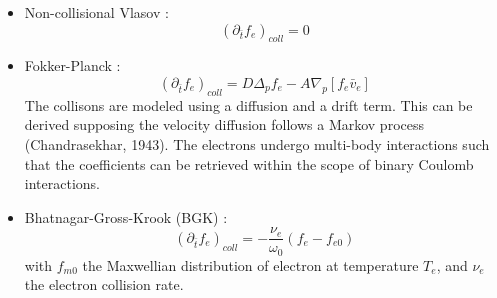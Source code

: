 \begin{itemize}
\item Non-collisional Vlasov :
\begin{equation}
 (\partial_{\bar{t}}f_e)_{coll} = 0
\end{equation}
\item Fokker-Planck :
\begin{equation}
 (\partial_{\bar{t}}f_e)_{coll} =  D \Delta_{p}f_e - A \nabla_{p}[f_e\bar{v}_e]
\end{equation}
The collisons are modeled using a diffusion and a drift term. This can be derived supposing the velocity diffusion follows a Markov process (Chandrasekhar, 1943). The electrons undergo 
multi-body interactions such that the coefficients can be retrieved within the scope of binary Coulomb interactions.

\item Bhatnagar-Gross-Krook (BGK) :
\begin{equation}
 (\partial_{\bar{t}}f_e)_{coll} = -\frac{\nu_e}{\omega_0} (f_e - f_{e0})
\end{equation}
with $f_{m0}$ the Maxwellian distribution of electron at temperature $T_e$, and $\nu_e$ the electron collision rate.

\end{itemize}



















